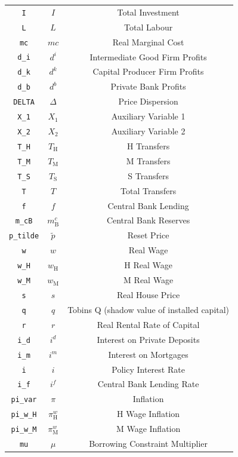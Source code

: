 \begin{center}
\begin{longtable}{ccc}
\texttt{I} & $I$ & Total Investment\\
\texttt{L} & $L$ & Total Labour\\
\texttt{mc} & $mc$ & Real Marginal Cost\\
\texttt{d\_i} & $d^i$ & Intermediate Good Firm Profits\\
\texttt{d\_k} & $d^k$ & Capital Producer Firm Profits\\
\texttt{d\_b} & $d^b$ & Private Bank Profits\\
\texttt{DELTA} & $\Delta$ & Price Dispersion\\
\texttt{X\_1} & $X_1$ & Auxiliary Variable 1\\
\texttt{X\_2} & $X_2$ & Auxiliary Variable 2\\
\texttt{T\_H} & $T_\mathrm{H}$ & H Transfers\\
\texttt{T\_M} & $T_\mathrm{M}$ & M Transfers\\
\texttt{T\_S} & $T_\mathrm{S}$ & S Transfers\\
\texttt{T} & $T$ & Total Transfers\\
\texttt{f} & $f$ & Central Bank Lending\\
\texttt{m\_cB} & $m^c_\mathrm{B}$ & Central Bank Reserves\\
\texttt{p\_tilde} & $\tilde{p}$ & Reset Price\\
\texttt{w} & $w$ & Real Wage\\
\texttt{w\_H} & $w_\mathrm{H}$ & H Real Wage\\
\texttt{w\_M} & $w_\mathrm{M}$ & M Real Wage\\
\texttt{s} & $s$ & Real House Price\\
\texttt{q} & $q$ & Tobins Q (shadow value of installed capital)\\
\texttt{r} & $r$ & Real Rental Rate of Capital\\
\texttt{i\_d} & $i^d$ & Interest on Private Deposits\\
\texttt{i\_m} & $i^m$ & Interest on Mortgages\\
\texttt{i} & $i$ & Policy Interest Rate\\
\texttt{i\_f} & $i^f$ & Central Bank Lending Rate\\
\texttt{pi\_var} & $\pi$ & Inflation\\
\texttt{pi\_w\_H} & $\pi^w_\mathrm{H}$ & H Wage Inflation\\
\texttt{pi\_w\_M} & $\pi^w_\mathrm{M}$ & M Wage Inflation\\
\texttt{mu} & $\mu$ & Borrowing Constraint Multiplier\\

\end{longtable}
\end{center}

